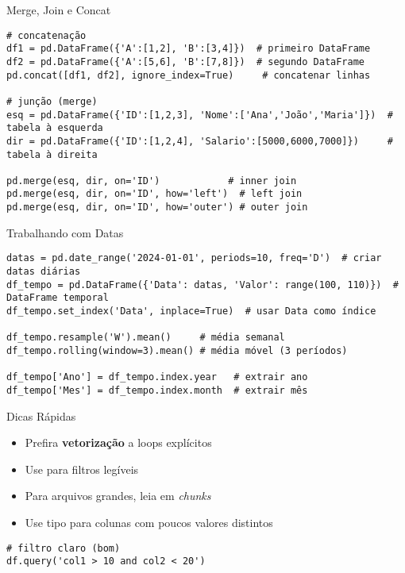 \documentclass[aspectratio=169]{beamer}
\let\texttt\textttblue
\begin{document}
\begin{frame}[fragile]{Merge, Join e Concat}
\begin{lstlisting}
# concatenação
df1 = pd.DataFrame({'A':[1,2], 'B':[3,4]})  # primeiro DataFrame
df2 = pd.DataFrame({'A':[5,6], 'B':[7,8]})  # segundo DataFrame
pd.concat([df1, df2], ignore_index=True)     # concatenar linhas

# junção (merge)
esq = pd.DataFrame({'ID':[1,2,3], 'Nome':['Ana','João','Maria']})  # tabela à esquerda
dir = pd.DataFrame({'ID':[1,2,4], 'Salario':[5000,6000,7000]})     # tabela à direita

pd.merge(esq, dir, on='ID')            # inner join
pd.merge(esq, dir, on='ID', how='left')  # left join
pd.merge(esq, dir, on='ID', how='outer') # outer join
\end{lstlisting}
\end{frame}

\begin{frame}[fragile]{Trabalhando com Datas}
\begin{lstlisting}
datas = pd.date_range('2024-01-01', periods=10, freq='D')  # criar datas diárias
df_tempo = pd.DataFrame({'Data': datas, 'Valor': range(100, 110)})  # DataFrame temporal
df_tempo.set_index('Data', inplace=True)  # usar Data como índice

df_tempo.resample('W').mean()     # média semanal
df_tempo.rolling(window=3).mean() # média móvel (3 períodos)

df_tempo['Ano'] = df_tempo.index.year   # extrair ano
df_tempo['Mes'] = df_tempo.index.month  # extrair mês
\end{lstlisting}
\end{frame}

\begin{frame}[fragile]{Dicas Rápidas}
  \begin{itemize}
    \item Prefira \textbf{vetorização} a loops explícitos
    \item Use \texttt{query()} para filtros legíveis
    \item Para arquivos grandes, leia em \textit{chunks}
    \item Use tipo \texttt{category} para colunas com poucos valores distintos
  \end{itemize}
\vspace{0.4em}
\begin{lstlisting}
# filtro claro (bom)
df.query('col1 > 10 and col2 < 20')
\end{lstlisting}
\end{frame}
\end{document}
